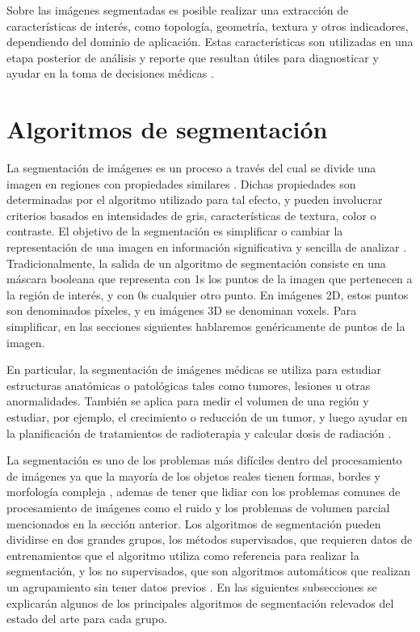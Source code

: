 Sobre las imágenes segmentadas es posible realizar una extracción de características de interés, como topología, geometría, textura y otros indicadores, dependiendo del dominio de aplicación. Estas características son utilizadas en una etapa posterior de análisis y reporte que resultan útiles para diagnosticar y ayudar en la toma de decisiones médicas \citep{pham2000current}.

\section{Algoritmos de segmentación}\label{section:algoritmos}
La segmentación de imágenes es un proceso a través del cual se divide una imagen en regiones con propiedades similares \citep{pham2000current}. Dichas propiedades son determinadas por el algoritmo utilizado para tal efecto, y pueden involucrar criterios basados en intensidades de gris, características de textura, color o contraste. El objetivo de la segmentación es simplificar o cambiar la representación de una imagen en información significativa y sencilla de analizar \citep{barghout2003perceptual}. Tradicionalmente, la salida de un algoritmo de segmentación consiste en una máscara booleana que representa con 1s los puntos de la imagen que pertenecen a la región de interés, y con 0s cualquier otro punto. En imágenes 2D, estos puntos son denominados píxeles, y en imágenes 3D se denominan voxels. Para simplificar, en las secciones siguientes hablaremos genéricamente de puntos de la imagen.

En particular, la segmentación de imágenes médicas se utiliza para estudiar estructuras anatómicas o patológicas tales como tumores, lesiones u otras anormalidades. También se aplica para medir el volumen de una región y estudiar, por ejemplo, el crecimiento o reducción de un tumor, y luego ayudar en la planificación de tratamientos de radioterapia y calcular dosis de radiación \citep{sharma2010automated}.

La segmentación es uno de los problemas más difíciles dentro del procesamiento de imágenes ya que la mayoría de los objetos reales tienen formas, bordes y morfología compleja \citep{wu2007segmentation}, ademas de tener que lidiar con los problemas comunes de procesamiento de imágenes como el ruido y los problemas de volumen parcial mencionados en la sección anterior. 
Los algoritmos de segmentación pueden dividirse en dos grandes grupos, los métodos supervisados, que requieren datos de entrenamientos que el algoritmo utiliza como referencia para realizar la segmentación, y los no supervisados, que son algoritmos automáticos que realizan un agrupamiento sin tener datos previos \citep{pham2000current}.
En las siguientes subsecciones se explicarán algunos de los principales algoritmos de segmentación relevados del estado del arte para cada grupo.

